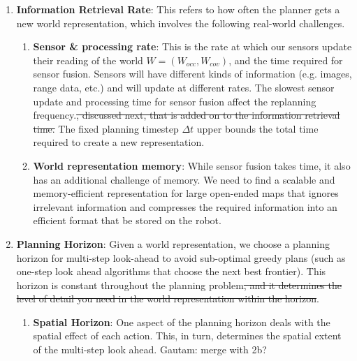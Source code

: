 \documentclass[letterpaper]{article} %
\newcommand{\gautam}[1]{{\color{cyan}Gautam: #1 }}
\begin{document}
\begin{enumerate}
  \item \textbf{Information Retrieval Rate}: This refers to how often the planner gets a new world representation, which involves the following real-world challenges. %
  \begin{enumerate}
    \item \label{en:issue1a} \textbf{Sensor \& processing rate}: This is the rate at which our sensors update their reading of the world $W = (W_{occ}, W_{cov})$, and the time required for sensor fusion. Sensors will have different kinds of information (e.g. images, range data, etc.) and will update at different rates. The slowest sensor update and processing time for sensor fusion affect the replanning frequency.\sout{, discussed next, that is added on to the information retrieval time.} The fixed planning timestep $\Delta t$ upper bounds the total time required to create a new representation.
  \item \label{en:issue1b} \textbf{World representation memory}: While sensor fusion takes time, it also has an additional challenge of memory. We need to find a scalable and memory-efficient representation for large open-ended maps that ignores irrelevant information and compresses the required information into an efficient format that be stored on the robot.
 \end{enumerate}
 \item \textbf{Planning Horizon}: Given a world representation, we choose a planning horizon for multi-step look-ahead to avoid sub-optimal greedy plans (such as one-step look ahead algorithms that choose the next best frontier). This horizon is constant throughout the planning problem\sout{, and it determines the level of detail you need in the world representation within the horizon}.
 \begin{enumerate}
  \item \label{en:issue2a} \textbf{Spatial Horizon}: One aspect of the planning horizon deals with the spatial effect of each action. This, in turn, determines the spatial extent of the multi-step look ahead. \gautam{merge with 2b?}

\end{enumerate}
\end{enumerate}
\end{document}
